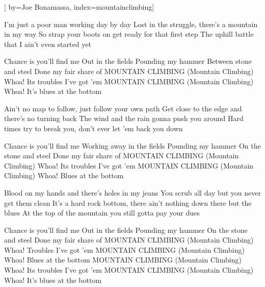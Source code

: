 
[%
    by={Joe Bonamassa},
    index={mountainclimbing}]


    \label{mountainclimbing}

    \beginverse
        I'm just a poor man working day by day
        Lost in the struggle, there's a mountain in my way
        So strap your boots on get ready for that first step
        The uphill battle that I ain't even started yet
    \endverse

    \beginchorus
        Chance is you'll find me
        Out in the fields
        Pounding my hammer
        Between stone and steel
        Done my fair share of
        MOUNTAIN CLIMBING (Mountain Climbing)
        Whoa! Its troubles I've got 'em
        MOUNTAIN CLIMBING (Mountain Climbing)
        Whoa! It's blues at the bottom
    \endchorus

    \beginverse
        Ain't no map to follow, just follow your own path
        Get close to the edge and there's no turning back
        The wind and the rain gonna push you around
        Hard times try to break you, don't ever let 'em back you down
    \endverse

    \beginchorus
        Chance is you'll find me
        Working away in the fields
        Pounding my hammer
        On the stone and steel
        Done my fair share of
        MOUNTAIN CLIMBING (Mountain Climbing)
        Whoa! Its troubles I've got 'em
        MOUNTAIN CLIMBING (Mountain Climbing)
        Whoa! Blues at the bottom
    \endchorus

    \beginverse
        Blood on my hands and there's holes in my jeans
        You scrub all day but you never get them clean
        It's a hard rock bottom, there ain't nothing down there but the blues
        At the top of the mountain you still gotta pay your dues
    \endverse

    \beginchorus
        Chance is you'll find me
        Out in the fields
        Pounding my hammer
        On the stone and steel
        Done my fair share of
        MOUNTAIN CLIMBING (Mountain Climbing)
        Whoa! Troubles I've got 'em
        MOUNTAIN CLIMBING (Mountain Climbing)
        Whoa! Blues at the bottom
        MOUNTAIN CLIMBING (Mountain Climbing)
        Whoa! Its troubles I've got 'em
        MOUNTAIN CLIMBING (Mountain Climbing)
        Whoa! It's blues at the bottom
    \endchorus
\endsong
